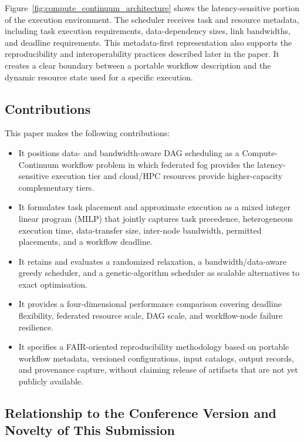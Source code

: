Figure~\ref{fig:compute_continuum_architecture} shows the latency-sensitive portion of the execution environment. The scheduler receives task and resource metadata, including task execution requirements, data-dependency sizes, link bandwidths, and deadline requirements. This metadata-first representation also supports the reproducibility and interoperability practices described later in the paper. It creates a clear boundary between a portable workflow description and the dynamic resource state used for a specific execution.


\subsection{Contributions}

This paper makes the following contributions:
\begin{itemize}[leftmargin=*]
    \item It positions data- and bandwidth-aware DAG scheduling as a Compute-Continuum workflow problem in which federated fog provides the latency-sensitive execution tier and cloud/HPC resources provide higher-capacity complementary tiers.
    \item It formulates task placement and approximate execution as a mixed integer linear program (MILP) that jointly captures task precedence, heterogeneous execution time, data-transfer size, inter-node bandwidth, permitted placements, and a workflow deadline.
    \item It retains and evaluates a randomized relaxation, a band\-width/data-aware greedy scheduler, and a genetic-algorithm scheduler as scalable alternatives to exact optimisation.
    \item It provides a four-dimensional performance comparison covering deadline flexibility, federated resource scale, DAG scale, and workflow-node failure resilience.
    \item It specifies a FAIR-oriented reproducibility methodology based on portable workflow metadata, versioned configurations, input catalogs, output records, and provenance capture, without claiming release of artifacts that are not yet publicly available.
\end{itemize}

\subsection{Relationship to the Conference Version and Novelty of This Submission}
\label{subsec:novelty}

